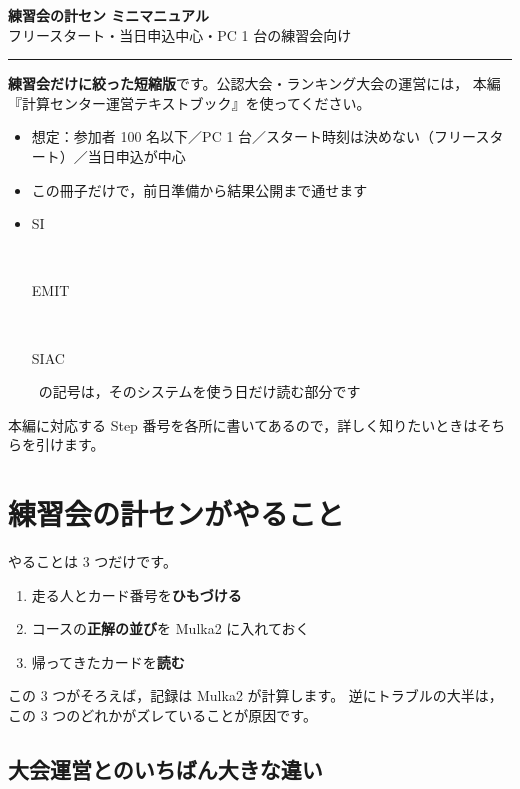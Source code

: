 \documentclass[a4paper,10pt]{ltjsarticle}
\DeclareRobustCommand{\tg}[2]{{\colorbox{#1}{\color{white}\sffamily\bfseries\scriptsize\strut #2}}}
\DeclareRobustCommand{\tSI}{\tg{cSI}{SI}}
\DeclareRobustCommand{\tEMIT}{\tg{cEMIT}{EMIT}}
\DeclareRobustCommand{\tSIAC}{\tg{cSIAC}{SIAC}}
\begin{document}
\gtfamily\sffamily

\begin{center}
\vspace*{2mm}
{\LARGE\bfseries 練習会の計セン ミニマニュアル}\\[3mm]
{\normalsize フリースタート・当日申込中心・PC 1 台の練習会向け}\\[2mm]
\textcolor{rulec}{\rule{0.9\textwidth}{0.8pt}}
\end{center}

\vspace{2mm}

\begin{Note}[この冊子について]
\textbf{練習会だけに絞った短縮版}です。公認大会・ランキング大会の運営には，
本編『計算センター運営テキストブック』を使ってください。
\begin{itemize}
\item 想定：参加者 100 名以下／PC 1 台／スタート時刻は決めない（フリースタート）／当日申込が中心
\item この冊子だけで，前日準備から結果公開まで通せます
\item \tSI\ \tEMIT\ \tSIAC\ の記号は，そのシステムを使う日だけ読む部分です
\end{itemize}
本編に対応する Step 番号を各所に書いてあるので，詳しく知りたいときはそちらを引けます。
\end{Note}

\section*{練習会の計センがやること}

やることは 3 つだけです。

\begin{enumerate}
\item 走る人とカード番号を\textbf{ひもづける}
\item コースの\textbf{正解の並び}を Mulka2 に入れておく
\item 帰ってきたカードを\textbf{読む}
\end{enumerate}

この 3 つがそろえば，記録は Mulka2 が計算します。
逆にトラブルの大半は，この 3 つのどれかがズレていることが原因です。

\subsection*{大会運営とのいちばん大きな違い}
\end{document}
